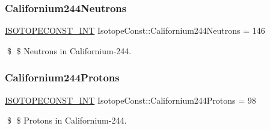 \subsubsection{\texorpdfstring{Californium244\+Neutrons}{Californium244Neutrons}}
{\footnotesize\ttfamily \mbox{\hyperlink{group___isotope_const-_macros_ga5f18360b3e99483a35c32d789e62621c}{I\+S\+O\+T\+O\+P\+E\+C\+O\+N\+S\+T\+\_\+\+I\+NT}} Isotope\+Const\+::\+Californium244\+Neutrons = 146}

\$ \$ Neutrons in Californium-\/244. \mbox{\label{group___isotope_const-_californium-_cf244_ga550f68a2d1bef37041c28ba6d9882396}} 
\subsubsection{\texorpdfstring{Californium244\+Protons}{Californium244Protons}}
{\footnotesize\ttfamily \mbox{\hyperlink{group___isotope_const-_macros_ga5f18360b3e99483a35c32d789e62621c}{I\+S\+O\+T\+O\+P\+E\+C\+O\+N\+S\+T\+\_\+\+I\+NT}} Isotope\+Const\+::\+Californium244\+Protons = 98}

\$ \$ Protons in Californium-\/244. 
